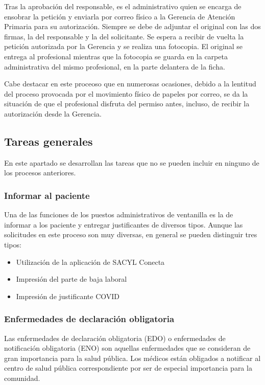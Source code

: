 Tras la aprobación del responsable, es el administrativo quien se encarga de ensobrar la petición y enviarla por correo físico a la Gerencia de Atención Primaria para su autorización.
Siempre se debe de adjuntar el original con las dos firmas, la del responsable y la del solicitante.
Se espera a recibir de vuelta la petición autorizada por la Gerencia y se realiza una fotocopia.
El original se entrega al profesional mientras que la fotocopia se guarda en la carpeta administrativa del mismo profesional, en la parte delantera de la ficha.

Cabe destacar en este proceoso que en numerosas ocasiones, debido a la lentitud del proceso provocada por el movimiento físico de papeles por correo, se da la situación de que el profesional disfruta del permiso antes, incluso, de recibir la autorización desde la Gerencia.

\subsection{Tareas generales}

En este apartado se desarrollan las tareas que no se pueden incluir en ninguno de los procesos anteriores.

\subsubsection{Informar al paciente}

Una de las funciones de los puestos administrativos de ventanilla es la de informar a los paciente y entregar justificantes de diversos tipos. Aunque las solicitudes en este proceso son muy diversas, en general se pueden distinguir tres tipos:

\begin{itemize}
    \item Utilización de la aplicación de SACYL Conecta
    \item Impresión del parte de baja laboral
    \item Impresión de justificante COVID
\end{itemize}

\subsubsection{Enfermedades de declaración obligatoria}

Las enfermedades de declaración obligatoria (EDO) o enfermedades de notificación obligatoria (ENO) son aquellas enfermedades que se consideran de gran importancia para la salud pública. Los médicos están obligados a notificar al centro de salud pública correspondiente por ser de especial importancia para la comunidad.

